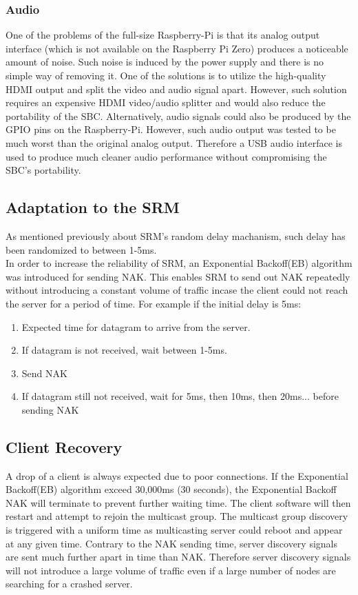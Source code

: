 \documentclass[12pt]{article}
\begin{document}
\subsubsection{Audio}
One of the problems of the full-size Raspberry-Pi is that its analog output interface (which is not available on the Raspberry Pi Zero) produces a noticeable amount of noise. Such noise is induced by the power supply and there is no simple way of removing it. One of the solutions is to utilize the high-quality HDMI output and split the video and audio signal apart. However, such solution requires an expensive HDMI video/audio splitter and would also reduce the portability of the SBC. Alternatively, audio signals could also be produced by the GPIO pins on the Raspberry-Pi. However, such audio output was tested to be much worst than the original analog output. Therefore a USB audio interface is used to produce much cleaner audio performance without compromising the SBC's portability.

\subsection{Adaptation to the SRM}
As mentioned previously about SRM's random delay machanism, such delay has been randomized to between 1-5ms. \\

In order to increase the reliability of SRM, an Exponential Backoff(EB) algorithm\cite{Exponential_Backoff:1} was introduced for sending NAK. This enables SRM to send out NAK repeatedly without introducing a constant volume of traffic incase the client could not reach the server for a period of time. For example if the initial delay is 5ms:

\begin{enumerate}
  \item Expected time for datagram to arrive from the server.
  \item If datagram is not received, wait between 1-5ms.
  \item Send NAK
  \item If datagram still not received, wait for 5ms, then 10ms, then 20ms... before sending NAK
\end{enumerate}

\subsection{Client Recovery}
A drop of a client is always expected due to poor connections. If the Exponential Backoff(EB) algorithm exceed 30,000ms (30 seconds), the Exponential Backoff NAK will terminate to prevent further waiting time. The client software will then restart and attempt to rejoin the multicast group. The multicast group discovery is triggered with a uniform time as multicasting server could reboot and appear at any given time. Contrary to the NAK sending time, server discovery signals are sent much further apart in time than NAK. Therefore server discovery signals will not introduce a large volume of traffic even if a large number of nodes are searching for a crashed server. 
\end{document}
